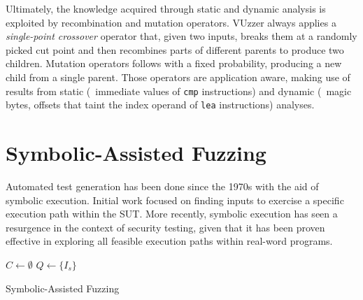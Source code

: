 Ultimately, the knowledge acquired through static and dynamic analysis is
exploited by recombination and mutation operators. VUzzer always applies a
\emph{single-point crossover} operator that, given two inputs, breaks them at a
randomly picked cut point and then recombines parts of different parents to
produce two children. Mutation operators follows with a fixed probability,
producing a new child from a single parent. Those operators are application
aware, making use of results from static (\eg~immediate values of \texttt{cmp}
instructions) and dynamic (\eg~magic bytes, offsets that taint the index operand
of \texttt{lea} instructions) analyses.

\section{Symbolic-Assisted Fuzzing}
Automated test generation has been done since the 1970s with the aid of symbolic
execution. Initial work focused on finding inputs to exercise a specific
execution path within the \ac{SUT}. More recently, symbolic execution has seen a
resurgence in the context of security testing, given that it has been proven
effective in exploring all feasible execution paths within real-word programs.

\begin{algorithm}
    \DontPrintSemicolon%
    \BlankLine%
    $C \leftarrow \emptyset$\;
    $Q \leftarrow \{I_s\}$\;\label{algo:symfuzz:initq}
    \caption{Symbolic-Assisted Fuzzing}
\label{algo:symfuzz}
\end{algorithm}

